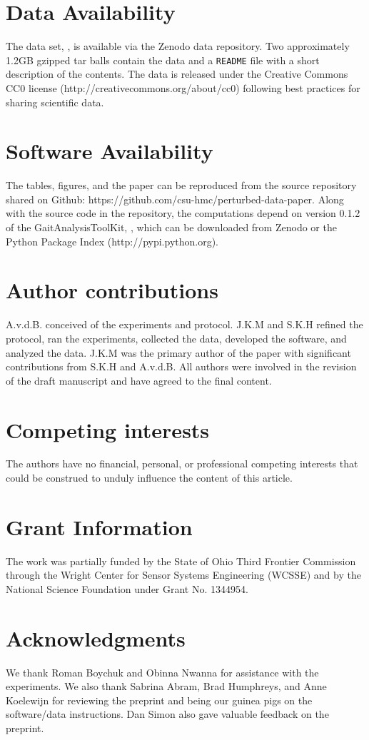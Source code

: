 \documentclass[fleqn,12pt]{wlpeerj}
\begin{document}
\section*{Data Availability}
%
The data set, \cite{Moore2014}, is available via the Zenodo data repository.
Two approximately 1.2GB gzipped tar balls contain the data and a \verb|README|
file with a short description of the contents. The data is released under the
Creative Commons CC0 license (http://creativecommons.org/about/cc0) following
best practices for sharing scientific data.

\section*{Software Availability}
%
The tables, figures, and the paper can be reproduced from the source
repository shared on Github: https://github.com/csu-hmc/perturbed-data-paper.
Along with the source code in the repository, the computations depend on
version 0.1.2 of the GaitAnalysisToolKit, \cite{Moore2014a}, which can be
downloaded from Zenodo or the Python Package Index (http://pypi.python.org).

\section*{Author contributions}
A.v.d.B. conceived of the experiments and protocol. J.K.M and S.K.H refined the
protocol, ran the experiments, collected the data, developed the software, and
analyzed the data. J.K.M was the primary author of the paper with significant
contributions from S.K.H and A.v.d.B. All authors were involved in the revision
of the draft manuscript and have agreed to the final content.

\section*{Competing interests}
The authors have no financial, personal, or professional competing interests
that could be construed to unduly influence the content of this article.

\section*{Grant Information}
The work was partially funded by the State of Ohio Third Frontier Commission
through the Wright Center for Sensor Systems Engineering (WCSSE) and by the
National Science Foundation under Grant No. 1344954.

\section*{Acknowledgments}
%
We thank Roman Boychuk and Obinna Nwanna for assistance with the experiments.
We also thank Sabrina Abram, Brad Humphreys, and Anne Koelewijn for reviewing
the preprint and being our guinea pigs on the software/data instructions. Dan
Simon also gave valuable feedback on the preprint.


\end{document}
